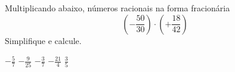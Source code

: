 Multiplicando abaixo, números racionais na forma fracionária
\[\left(-\frac{50}{30}\right)\cdot\left(+\frac{18}{42}\right)\]
Simplifique e calcule.

$-\frac{5}{7}$
$-\frac{9}{25}$
$-\frac{3}{7}$
$-\frac{21}{4}$
$ \frac{3}{5}$



